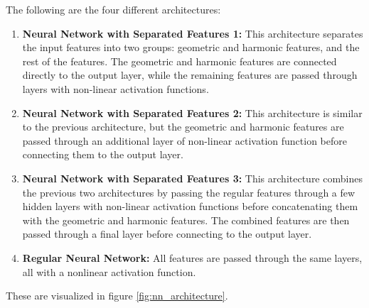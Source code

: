 The following are the four different architectures:
\begin{enumerate}
    \item \textbf{Neural Network with Separated Features 1:} This architecture separates the input features into two groups: geometric and harmonic features, and the rest of the features.
    The geometric and harmonic features are connected directly to the output layer, while the remaining features are passed through layers with non-linear activation functions.
    \item \textbf{Neural Network with Separated Features 2:} This architecture is similar to the previous architecture,
    but the geometric and harmonic features are passed through an additional layer of non-linear activation function before connecting them to the output layer.
    \item \textbf{Neural Network with Separated Features 3:} This architecture combines the previous two architectures by passing the regular features through a few hidden layers with non-linear activation functions before concatenating them with the geometric and harmonic features.
    The combined features are then passed through a final layer before connecting to the output layer.
    \item \textbf{Regular Neural Network:} All features are passed through the same layers, all with a nonlinear activation function.
\end{enumerate}
These are visualized in figure \ref{fig:nn_architecture}.

